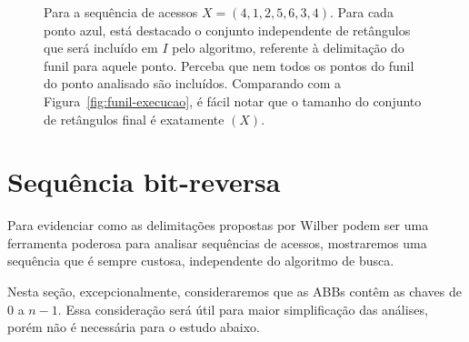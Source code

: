 \begin{figure}
    \caption{Para a sequência de acessos $X = (4,1,2,5,6,3,4)$. Para cada ponto azul, está destacado o conjunto independente de retângulos que será incluído em $I$ pelo algoritmo, referente à delimitação do funil para aquele ponto. Perceba que nem todos os pontos do funil do ponto analisado são incluídos. Comparando com a Figura~\ref{fig:funil-execucao}, é fácil notar que o tamanho do conjunto de retângulos final é exatamente \Funil$(X)$.}
\label{fig:retangulos_no_funil}
\end{figure}

\section{Sequência bit-reversa}

Para evidenciar como as delimitações propostas por Wilber podem ser uma ferramenta poderosa para analisar sequências de acessos, mostraremos uma sequência que é sempre custosa, independente do algoritmo de busca. 

Nesta seção, excepcionalmente, consideraremos que as ABBs contêm as chaves de $0$ a $n-1$. Essa consideração será útil para maior simplificação das análises, porém não é necessária para o estudo abaixo. 

